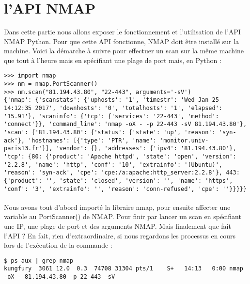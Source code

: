 \documentclass[12pt]{report}
\begin{document}
		\section{l'API NMAP}
			\paragraph{}
				Dans cette partie nous allons exposer le fonctionnement et l'utilisation de l'API NMAP Python. Pour que cette API fonctionne, NMAP doit être installé sur la machine. Voici la démarche à suivre pour effectuer un scan sur la même machine que tout à l'heure mais en spécifiant une plage de port mais, en Python :
				\begin{lstlisting}[caption=Scan NMAP avec Python, captionpos=b]
>>> import nmap
>>> nm = nmap.PortScanner()
>>> nm.scan("81.194.43.80", "22-443", arguments='-sV')
{'nmap': {'scanstats': {'uphosts': '1', 'timestr': 'Wed Jan 25 14:12:35 2017', 'downhosts': '0', 'totalhosts': '1', 'elapsed': '15.91'}, 'scaninfo': {'tcp': {'services': '22-443', 'method': 'connect'}}, 'command_line': 'nmap -oX - -p 22-443 -sV 81.194.43.80'}, 'scan': {'81.194.43.80': {'status': {'state': 'up', 'reason': 'syn-ack'}, 'hostnames': [{'type': 'PTR', 'name': 'monitor.univ-paris13.fr'}], 'vendor': {}, 'addresses': {'ipv4': '81.194.43.80'}, 'tcp': {80: {'product': 'Apache httpd', 'state': 'open', 'version': '2.2.8', 'name': 'http', 'conf': '10', 'extrainfo': '(Ubuntu)', 'reason': 'syn-ack', 'cpe': 'cpe:/a:apache:http_server:2.2.8'}, 443: {'product': '', 'state': 'closed', 'version': '', 'name': 'https', 'conf': '3', 'extrainfo': '', 'reason': 'conn-refused', 'cpe': ''}}}}}
				\end{lstlisting}
			\paragraph{}
				Nous avons tout d'abord importé la libraire nmap, pour ensuite affecter une variable au PortScanner() de NMAP. Pour finir par lancer un scan en spécifiant une IP, une plage de port et des arguments NMAP. Mais finalement que fait l'API ? En fait, rien d'extraordinaire, si nous regardons les processus en cours lors de l'exécution de la commande :
				\begin{lstlisting}
$ ps aux | grep nmap
kungfury  3061 12.0  0.3  74708 31304 pts/1    S+   14:13   0:00 nmap -oX - 81.194.43.80 -p 22-443 -sV
				\end{lstlisting}
\end{document}
